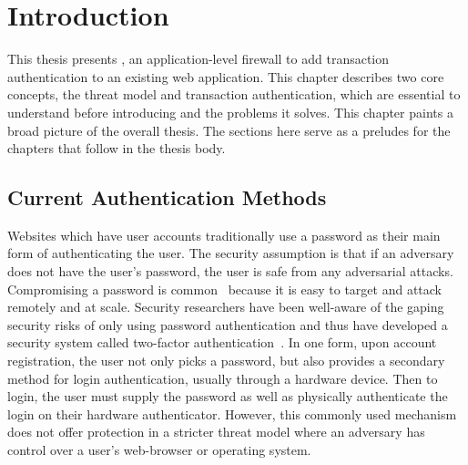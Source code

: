 \chapter{Introduction}

This thesis presents \sys{}, an application-level firewall to add transaction authentication to an existing web application. This chapter describes two core concepts, the threat model and transaction authentication, which are essential to understand before introducing \sys{} and the problems it solves. This chapter paints a broad picture of the overall thesis. The sections here serve as a preludes for the chapters that follow in the thesis body.





\section{Current Authentication Methods}

Websites which have user accounts traditionally use a password as their main form of authenticating the user. The security assumption is that if an adversary does not have the user's password, the user is safe from any adversarial attacks. Compromising a password is common~\cite{questRemovePasswords} because it is easy to target and attack remotely and at scale. Security researchers have been well-aware of the gaping security risks of only using password authentication and thus have developed a security system called two-factor authentication~\cite{2FA}. In one form, upon account registration, the user not only picks a password, but also provides a secondary method for login authentication, usually through a hardware device. Then to login, the user must supply the password as well as physically authenticate the login on their hardware authenticator. However, this commonly used mechanism does not offer protection in a stricter threat model where an adversary has control over a user's web-browser or operating system. 

